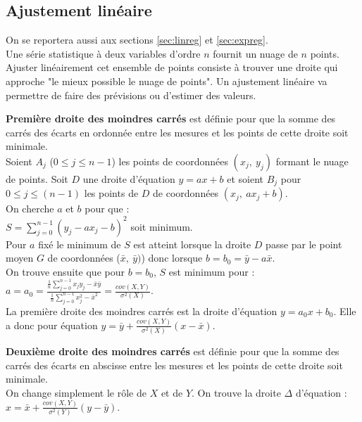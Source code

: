 \documentclass[a4paper,11pt]{book}
\begin{document}
\subsection{Ajustement lin\'eaire}
On se reportera aussi aux sections \ref{sec:linreg} et \ref{sec:expreg}.\\
Une s\'erie statistique \`a deux variables d'ordre $n$ fournit un nuage de $n$
 points. Ajuster lin\'eairement cet ensemble de points consiste \`a trouver une
droite qui approche "le mieux possible le nuage de points".
Un ajustement lin\'eaire va permettre de faire des pr\'evisions ou d'estimer 
des valeurs.

 {\bf Premi\`ere droite des moindres carr\'es} est d\'efinie pour que la somme
 des carr\'es des \'ecarts 
en ordonn\'ee entre les mesures et les points de cette droite soit minimale.\\
Soient $A_j$ ($0 \leq j \leq n-1$) les points de coordonn\'ees $(x_j,\ y_j)$ 
formant le nuage de points.
Soit $D$ une droite d'\'equation $y=ax+b$ et soient $B_j$  pour 
$0 \leq j \leq (n-1)$ les points de $D$ de coordonn\'ees $(x_j,\ ax_j+b)$.\\
On cherche $a$ et $b$ pour que :\\
$S=\sum_{j=0}^{n-1}(y_j-ax_j-b)^2$ soit minimum. \\
Pour $a$ fix\'e le minimum de $S$ est atteint lorsque la droite $D$ passe par 
le point moyen $G$ de coordonn\'ees ($\bar x,\ \bar y)$) donc lorsque
$b=b_0=\bar y-a \bar x$.\\
On trouve ensuite que pour $b=b_0$,  $S$ est minimum pour :\\
$\displaystyle a=a_0=\frac{\frac{1}{n}\sum_{j=0}^{n-1}x_j y_j-\bar x\bar y}
{\frac{1}{n}\sum_{j=0}^{n-1}x_j^2-\bar x^2} =\frac{cov(X,Y)}{\sigma^2(X)}$.\\
La premi\`ere droite des moindres carr\'es est la droite d'\'equation 
$y=a_0x+b_0$. Elle a donc pour \'equation 
$\displaystyle y=\bar y+\frac{cov(X,Y)}{\sigma^2(X)}(x-\bar x)$.

{\bf Deuxi\`eme droite des moindres carr\'es} est d\'efinie pour que la somme
 des carr\'es des \'ecarts 
en abscisse entre les mesures et les points de cette droite soit minimale.\\
On change simplement le r\^ole de $X$ et de $Y$.
On trouve la droite $\Delta$ d'\'equation :\\
$\displaystyle x=\bar x+\frac{cov(X,Y)}{\sigma^2(Y)}(y-\bar y)$.
\end{document}
